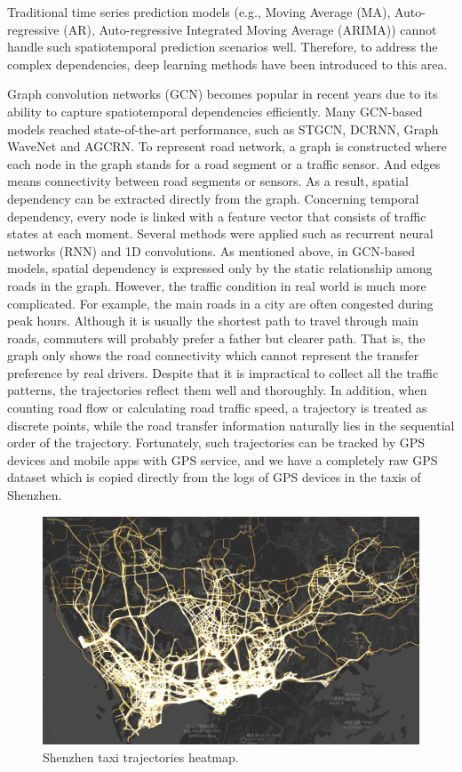 Traditional time series prediction models (e.g., Moving Average (MA), Auto-regressive (AR), Auto-regressive Integrated Moving Average (ARIMA)) cannot handle such spatiotemporal prediction scenarios well. Therefore, to address the complex dependencies, deep learning methods have been introduced to this area.

Graph convolution networks (GCN)\cite{GCN0} becomes popular in recent years due to its ability to capture spatiotemporal dependencies efficiently. Many GCN-based models reached state-of-the-art performance, such as STGCN\cite{STGCN}, DCRNN\cite{DCRNN}, Graph WaveNet\cite{GWNET} and AGCRN\cite{AGCRN}. To represent road network, a graph is constructed where each node in the graph stands for a road segment or a traffic sensor. And edges means connectivity between road segments or sensors. As a result, spatial dependency can be extracted directly from the graph. Concerning temporal dependency, every node is linked with a feature vector that consists of traffic states at each moment. Several methods were applied such as recurrent neural networks (RNN) and 1D convolutions. As mentioned above, in GCN-based models, spatial dependency is expressed only by the static relationship among roads in the graph. However, the traffic condition in real world is much more complicated. For example, the main roads in a city are often congested during peak hours. Although it is usually the shortest path to travel through main roads, commuters will probably prefer a father but clearer path. That is, the graph only shows the road connectivity which cannot represent the transfer preference by real drivers. Despite that it is impractical to collect all the traffic patterns, the trajectories reflect them well and thoroughly. In addition, when counting road flow or calculating road traffic speed, a trajectory is treated as discrete points, while the road transfer information naturally lies in the sequential order of the trajectory. Fortunately, such trajectories can be tracked by GPS devices and mobile apps with GPS service, and we have a completely raw GPS dataset which is copied directly from the logs of GPS devices in the taxis of Shenzhen.

\begin{figure}[htb]
    \centering
    \includegraphics[width=\textwidth]{images/traj_map.png}
    \caption{Shenzhen taxi trajectories heatmap.}
    \label{fig: traj_map}
  \end{figure}

